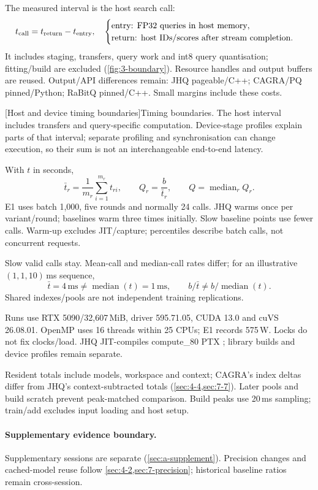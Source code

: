 The measured interval is the host search call:
\[
 t_{\rm call}=t_{\rm return}-t_{\rm entry},
 \quad
 \begin{cases}
 \text{entry: FP32 queries in host memory},\\
 \text{return: host IDs/scores after stream completion}.
 \end{cases}
\]
It includes staging, transfers, query work and int8 query quantisation; fitting/build are excluded (\cref{fig:3-boundary}).
Resource handles and output buffers are reused. Output/API differences remain: JHQ pageable/C++; CAGRA/PQ pinned/Python; RaBitQ pinned/C++. Small margins include these costs.

\par\medskip\noindent\begin{minipage}{\linewidth}
\centering\captionsetup{hypcap=false}
\resizebox{\linewidth}{!}{}
[Host and device timing boundaries]{Timing boundaries. The host interval includes transfers and
query-specific computation. Device-stage profiles explain parts of that
interval; separate profiling and synchronisation can change execution, so
their sum is not an interchangeable end-to-end latency.}
\label{fig:3-boundary}
\end{minipage}\par\medskip

With $t$ in seconds,
\begin{equation}
 \bar t_r=\frac1{m_r}\sum_{i=1}^{m_r}t_{ri},
 \qquad Q_r=\frac b{\bar t_r},
 \qquad Q=\operatorname{median}_r Q_r.
 \label{eq:3-throughput}
\end{equation}
E1 uses batch 1,000, five rounds and normally 24 calls. JHQ warms once per variant/round; baselines warm three times initially. Slow baseline points use fewer calls. Warm-up excludes JIT/capture; percentiles describe batch calls, not concurrent requests.

Slow valid calls stay. Mean-call and median-call rates differ; for an illustrative $(1,1,10)$\,ms sequence,
\[
 \bar t=4\,\mathrm{ms}\ne\operatorname{median}(t)=1\,\mathrm{ms},
 \qquad b/\bar t\ne b/\operatorname{median}(t).
\]
Shared indexes/pools are not independent training replications.

Runs use RTX 5090/32,607\,MiB, driver 595.71.05, CUDA 13.0 and cuVS 26.08.01. OpenMP uses 16 threads within 25 CPUs; E1 records 575\,W. Locks do not fix clocks/load. JHQ JIT-compiles compute\_80 PTX \cite{cuda_platform}; library builds and device profiles remain separate.

Resident totals include models, workspace and context; CAGRA's index deltas differ from JHQ's context-subtracted totals (\cref{sec:4-4,sec:7-7}). Later pools and build scratch prevent peak-matched comparison. Build peaks use 20\,ms sampling; train/add excludes input loading and host setup.

\paragraph{Supplementary evidence boundary.}
Supplementary sessions are separate (\cref{sec:a-supplement}). Precision changes and cached-model reuse follow \cref{sec:4-2,sec:7-precision}; historical baseline ratios remain cross-session.